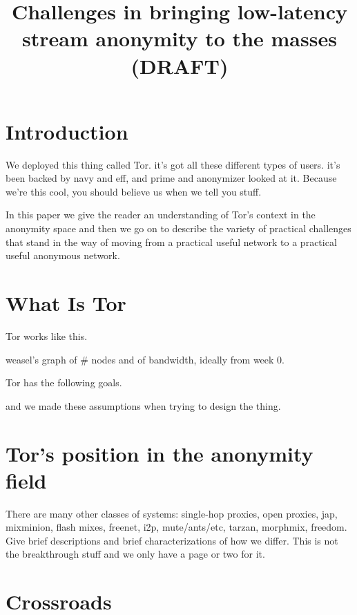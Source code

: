\documentclass[twocolumn]{article}
\title{Challenges in bringing low-latency stream anonymity to the masses (DRAFT)}
\begin{document}
\section{Introduction}

We deployed this thing called Tor. it's got all these different types of
users. it's been backed by navy and eff, and prime and anonymizer looked at
it. Because we're this cool, you should believe us when we tell you stuff.

In this paper we give the reader an understanding of Tor's context
in the anonymity space and then we go on to describe the variety of
practical challenges that stand in the way of moving from a practical
useful network to a practical useful anonymous network.


\section{What Is Tor}

Tor works like this.

weasel's graph of \# nodes and of bandwidth, ideally from week 0.

Tor has the following goals.

and we made these assumptions when trying to design the thing.

\section{Tor's position in the anonymity field}

There are many other classes of systems: single-hop proxies, open proxies,
jap, mixminion, flash mixes, freenet, i2p, mute/ants/etc, tarzan,
morphmix, freedom. Give brief descriptions and brief characterizations
of how we differ. This is not the breakthrough stuff and we only have
a page or two for it.


\section{Crossroads}
\end{document}
